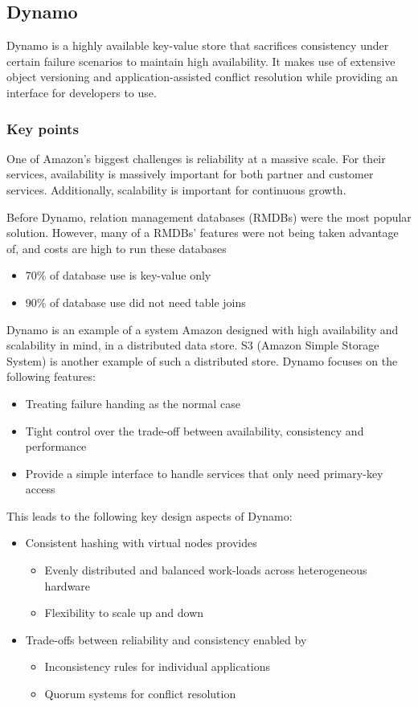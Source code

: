 \documentclass{sty/SizheArticle}
\begin{document}
\subsection{Dynamo}
Dynamo is a highly available key-value store that sacrifices consistency under
certain failure scenarios to maintain high availability. It makes use of
extensive object versioning and application-assisted conflict resolution
while providing an interface for developers to use.

\subsubsection{Key points}
One of Amazon's biggest challenges is reliability at a massive scale. For their
services, availability is massively important for both partner and customer
services. Additionally, scalability is important for continuous growth.

Before Dynamo, relation management databases (RMDBs) were the most popular
solution. However, many of a RMDBs' features were not being taken
advantage of, and costs are high to run these databases
\begin{itemize}
\item 70\% of database use is key-value only
\item 90\% of database use did not need table joins
\end{itemize}

Dynamo is an example of a system Amazon designed with high availability and
scalability in mind, in a distributed data store. S3 (Amazon Simple Storage
System) is another example of such a distributed store. Dynamo focuses on
the following features:
\begin{itemize}
\item Treating failure handing as the normal case
\item Tight control over the trade-off between availability, consistency and
performance
\item Provide a simple interface to handle services that only need primary-key
access
\end{itemize}
This leads to the following key design aspects of Dynamo:
\begin{itemize}
\item Consistent hashing with virtual nodes provides
	\begin{itemize}
	\item Evenly distributed and balanced work-loads across heterogeneous
	hardware
	\item Flexibility to scale up and down
	\end{itemize}
\item Trade-offs between reliability and consistency enabled by
    \begin{itemize}
    \item Inconsistency rules for individual applications
    \item Quorum systems for conflict resolution
    \end{itemize}
\end{itemize}
\end{document}
